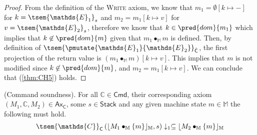 {\begin{proof}
From the definition of the \textsc{Write} axiom, we know that $m_1 = \emptyset[k \mapsto -]$ for $k = \tsem{\mathds{E}_1}_s$ and $m_2 = m_1[k \mapsto v]$ for $v = \tsem{\mathds{E}_2}_s$, therefore we know that $k \in \pred{dom}{m_1}$ which implies that $k \not\in \pred{dom}{m}$ given that $m_1 \bullet_\mathbb{M} m$ is defined. Then, by definition of $\tsem{\pmutate{\mathds{E}_1}{\mathds{E}_2}}_{\hat{\mathsf{C}}}$, the first projection of the return value is $(m_1 \bullet_\mathbb{M} m)[k \mapsto v]$. This implies that $m$ is not modified since $k \not\in \pred{dom}{m}$, and $m_2 = m_1[k \mapsto v]$. We can conclude that (\ref{thm:CH5}) holds.
\end{proof}
}

\thm \label{thm:cSound} (Command soundness). For all $\mathds{C} \in \mathsf{Cmd}$, their corresponding axiom $(M_1, \mathds{C}, M_2) \in \mathsf{Ax}_\mathsf{C}$, some $s \in \mathsf{Stack}$ and any given machine state $m \in \mathbb{M}$ the following must hold.
\[
	\tsem{\mathds{C}}_\mathsf{C} \left( \lfloor M_1 \bullet_\mathbb{M} \{m\} \rfloor_\mathbb{M}, s \right) \downarrow_1 \subseteq \lfloor M_2 \bullet_\mathbb{M} \{m\} \rfloor_\mathbb{M}
\]

